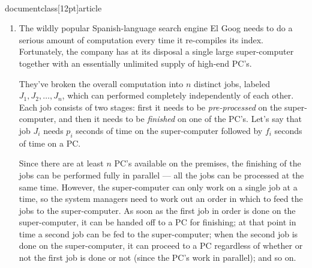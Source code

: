 \\documentclass[12pt]{article}
\begin{document}
\begin{enumerate}



\item 

The wildly popular Spanish-language search engine El Goog needs to do
a serious amount of computation every time it re-compiles its index.
Fortunately, the company has at its disposal a single large
super-computer together with an essentially unlimited supply
of high-end PC's.

They've broken the overall computation into $n$
distinct jobs, labeled $J_1, J_2, \ldots, J_n$,
which can performed completely independently of each other.
Each job consists of two stages:
first it needs to be {\em pre-processed} on the super-computer,
and then it needs to be {\em finished} on one of the PC's.
Let's say that job $J_i$ needs $p_i$ seconds of
time on the super-computer followed by $f_i$ seconds of time on a PC.

Since there are at least $n$ PC's available on the premises,
the finishing of the jobs can be performed fully in parallel ---
all the jobs can be processed at the same time.
However, the super-computer can only work on a single
job at a time, so the system managers need to work out
an order in which to feed the jobs to the super-computer.
As soon as the first job in order is done on the super-computer,
it can be handed off to a PC for finishing;
at that point in time a second job can be fed to the super-computer;
when the second job is done on the super-computer,
it can proceed to a PC regardless
of whether or not the first job is done or not
(since the PC's work in parallel);
and so on.


\end{enumerate}
\end{document}
